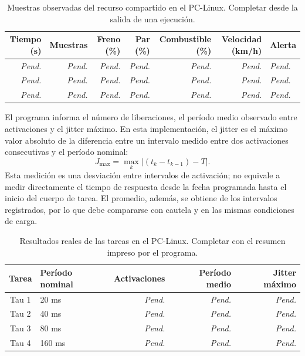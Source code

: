\documentclass[12pt,a4paper]{article}
\newcommand{\sinmedir}{\textit{Pend.}}
\begin{document}
\begin{table}[htbp]
  \centering
  \caption{Muestras observadas del recurso compartido en el PC-Linux. Completar desde la salida de una ejecución.}
  \label{tab:pc-sincronia}
  \small
  \begin{tabularx}{\linewidth}{@{}r r r r r r X@{}}
    \toprule
    Tiempo (s) & Muestras & Freno (\%) & Par (\%) & Combustible (\%) & Velocidad (km/h) & Alerta \\
    \midrule
    \sinmedir & \sinmedir & \sinmedir & \sinmedir & \sinmedir & \sinmedir & \sinmedir \\
    \sinmedir & \sinmedir & \sinmedir & \sinmedir & \sinmedir & \sinmedir & \sinmedir \\
    \sinmedir & \sinmedir & \sinmedir & \sinmedir & \sinmedir & \sinmedir & \sinmedir \\
    \bottomrule
  \end{tabularx}
\end{table}

El programa informa el número de liberaciones, el período medio observado entre activaciones y el jitter máximo. En esta implementación, el jitter es el máximo valor absoluto de la diferencia entre un intervalo medido entre dos activaciones consecutivas y el período nominal:
\[
 J_{\max}=\max_k\left|\left(t_k-t_{k-1}\right)-T\right|.
\]
Esta medición es una desviación entre intervalos de activación; no equivale a medir directamente el tiempo de respuesta desde la fecha programada hasta el inicio del cuerpo de tarea. El promedio, además, se obtiene de los intervalos registrados, por lo que debe compararse con cautela y en las mismas condiciones de carga.

\begin{table}[htbp]
  \centering
  \caption{Resultados reales de las tareas en el PC-Linux. Completar con el resumen impreso por el programa.}
  \label{tab:pc-metricas}
  \small
  \begin{tabular}{@{}c l r r r@{}}
    \toprule
    Tarea & Período nominal & Activaciones & Período medio & Jitter máximo \\
    \midrule
    Tau 1 & 20 ms & \sinmedir & \sinmedir & \sinmedir \\
    Tau 2 & 40 ms & \sinmedir & \sinmedir & \sinmedir \\
    Tau 3 & 80 ms & \sinmedir & \sinmedir & \sinmedir \\
    Tau 4 & 160 ms & \sinmedir & \sinmedir & \sinmedir \\
    \bottomrule
  \end{tabular}
\end{table}
\end{document}
